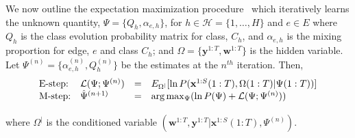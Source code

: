 \documentclass{bioinfo}
\begin{document}
\begin{methods}
We now outline the expectation maximization procedure~\cite{Bilmes98agentle,Mclachlan97embook} which
iteratively learns the unknown quantity, $\Psi = \{Q_{h},
\alpha_{e,h}\}$, for $h \in {\mathcal H} = \{1,\ldots, H\}$ and $e \in
E$ where  $Q_{h}$ is the class evolution
probability matrix for class, $C_h$, and $\alpha_{e,h}$ is the mixing
proportion for  edge, $e$ and class $C_h$; and $\Omega =
\{\mathbf{y}^{1:T},\mathbf{w}^{1:T}\}$ is
the hidden variable.  Let $\Psi^{(n)} = \{\alpha^{(n)}_{e,h},
Q^{(n)}_h\}$ be the estimates at the $n^{th}$ iteration. Then, 
\begin{equation}
  \label{eq:q-edge-mixture-em}
  \begin{array}[h]{llll}
  \textrm{E-step:} & {\mathcal L}(\Psi; \Psi^{(n)}) &=&
  E_{\Omega^{|} }  [ \ln P(\mathbf{x}^{1:S}(1:T), \Omega({1:T}) | \Psi({1:T}))] \\
\vspace{2 mm}
  \textrm{M-step:} & \hat{\Psi}^{(n+1)} &=& \arg\max_{\Psi} (\ln P(\Psi) +
  {\mathcal L}(\Psi; \Psi^{(n)} ) ) 
  \end{array}
\end{equation}
where $\Omega^{|}$ is the conditioned variable $(\mathbf{w}^{1:T},
\mathbf{y}^{1:T} | \mathbf{x}^{1:S}(1:T),  \Psi^{(n)})$.


\end{methods}
\end{document}
